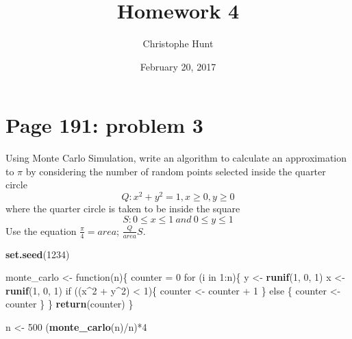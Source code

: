 \documentclass[]{article}
\title{Homework 4}
\author{Christophe Hunt}
\date{February 20, 2017}
\newenvironment{Shaded}{\begin{snugshade}}{\end{snugshade}}
\newcommand{\KeywordTok}[1]{\textcolor[rgb]{0.13,0.29,0.53}{\textbf{{#1}}}}
\newcommand{\DecValTok}[1]{\textcolor[rgb]{0.00,0.00,0.81}{{#1}}}
\newcommand{\StringTok}[1]{\textcolor[rgb]{0.31,0.60,0.02}{{#1}}}
\newcommand{\NormalTok}[1]{{#1}}
\begin{document}
\maketitle

{
\setcounter{tocdepth}{2}
\tableofcontents
}
\newpage

\section{Page 191: problem 3}\label{page-191-problem-3}

Using Monte Carlo Simulation, write an algorithm to calculate an
approximation to \(\pi\) by considering the number of random points
selected inside the quarter circle
\[Q:x^2 +y^2 = 1, x \geq 0, y \geq 0\] where the quarter circle is taken
to be inside the square \[S : 0 \leq x \leq 1~and~0 \leq y \leq 1\] Use
the equation \(\frac{\pi}{4}=area\); \(\frac{Q}{area}S\).

\begin{Shaded}
\begin{Highlighting}[]
\KeywordTok{set.seed}\NormalTok{(}\DecValTok{1234}\NormalTok{)}

\NormalTok{monte_carlo <-}\StringTok{ }\NormalTok{function(n)\{}
  \NormalTok{counter =}\StringTok{ }\DecValTok{0}
  \NormalTok{for (i in }\DecValTok{1}\NormalTok{:n)\{}
    \NormalTok{y <-}\StringTok{ }\KeywordTok{runif}\NormalTok{(}\DecValTok{1}\NormalTok{, }\DecValTok{0}\NormalTok{, }\DecValTok{1}\NormalTok{)}
    \NormalTok{x <-}\StringTok{ }\KeywordTok{runif}\NormalTok{(}\DecValTok{1}\NormalTok{, }\DecValTok{0}\NormalTok{, }\DecValTok{1}\NormalTok{)}
    \NormalTok{if ((x^}\DecValTok{2} \NormalTok{+}\StringTok{ }\NormalTok{y^}\DecValTok{2}\NormalTok{) <}\StringTok{ }\DecValTok{1}\NormalTok{)\{}
      \NormalTok{counter <-}\StringTok{ }\NormalTok{counter +}\StringTok{ }\DecValTok{1} 
    \NormalTok{\} else \{}
      \NormalTok{counter <-}\StringTok{ }\NormalTok{counter}
    \NormalTok{\}}
  \NormalTok{\}}
  \KeywordTok{return}\NormalTok{(counter)}
\NormalTok{\}}
\end{Highlighting}
\end{Shaded}

\begin{Shaded}
\begin{Highlighting}[]
\NormalTok{n <-}\StringTok{ }\DecValTok{500}
\NormalTok{(}\KeywordTok{monte_carlo}\NormalTok{(n)/n)*}\DecValTok{4}
\end{Highlighting}
\end{Shaded}
\end{document}

